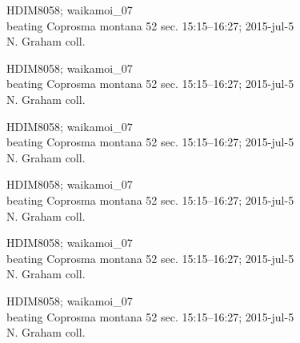 \documentclass[2pt]{extarticle}
\begin{document}
\noindent
\parbox{0.16\textwidth}{\tiny \raggedright \rule[-0.3\baselineskip]{0pt}{10pt}HDIM8058; waikamoi\_07\\ beating Coprosma montana 52 sec. 15:15--16:27; 2015-jul-5\\ N. Graham coll.}
\parbox{0.16\textwidth}{\tiny \raggedright \rule[-0.3\baselineskip]{0pt}{10pt}HDIM8058; waikamoi\_07\\ beating Coprosma montana 52 sec. 15:15--16:27; 2015-jul-5\\ N. Graham coll.}
\parbox{0.16\textwidth}{\tiny \raggedright \rule[-0.3\baselineskip]{0pt}{10pt}HDIM8058; waikamoi\_07\\ beating Coprosma montana 52 sec. 15:15--16:27; 2015-jul-5\\ N. Graham coll.}
\parbox{0.16\textwidth}{\tiny \raggedright \rule[-0.3\baselineskip]{0pt}{10pt}HDIM8058; waikamoi\_07\\ beating Coprosma montana 52 sec. 15:15--16:27; 2015-jul-5\\ N. Graham coll.}
\parbox{0.16\textwidth}{\tiny \raggedright \rule[-0.3\baselineskip]{0pt}{10pt}HDIM8058; waikamoi\_07\\ beating Coprosma montana 52 sec. 15:15--16:27; 2015-jul-5\\ N. Graham coll.}
\parbox{0.16\textwidth}{\tiny \raggedright \rule[-0.3\baselineskip]{0pt}{10pt}HDIM8058; waikamoi\_07\\ beating Coprosma montana 52 sec. 15:15--16:27; 2015-jul-5\\ N. Graham coll.} \\ 
\vspace{0.001in} 
\end{document}
